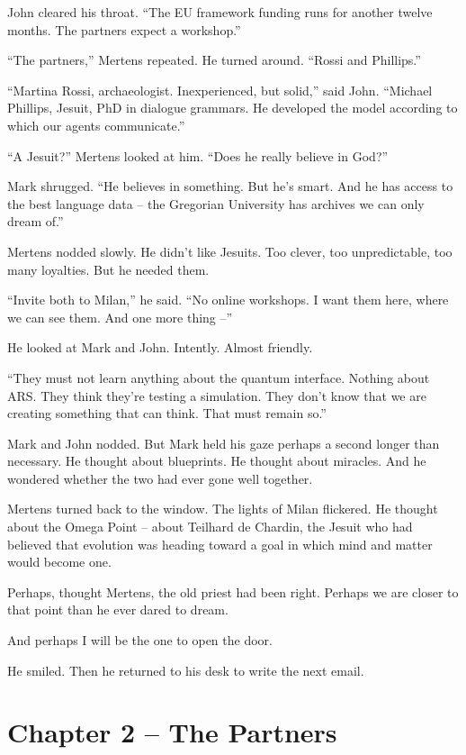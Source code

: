 \documentclass[
]{article}
\begin{document}
John cleared his throat. \enquote{The EU framework funding runs for another twelve months. The partners expect a workshop.}

\enquote{The partners,} Mertens repeated. He turned around. \enquote{Rossi and Phillips.}

\enquote{Martina Rossi, archaeologist. Inexperienced, but solid,} said John. \enquote{Michael Phillips, Jesuit, PhD in dialogue grammars. He developed the model according to which our agents communicate.}

\enquote{A Jesuit?} Mertens looked at him. \enquote{Does he really believe in God?}

Mark shrugged. \enquote{He believes in something. But he's smart. And he has access to the best language data -- the Gregorian University has archives we can only dream of.}

Mertens nodded slowly. He didn't like Jesuits. Too clever, too unpredictable, too many loyalties. But he needed them.

\enquote{Invite both to Milan,} he said. \enquote{No online workshops. I want them here, where we can see them. And one more thing --}

He looked at Mark and John. Intently. Almost friendly.

\enquote{They must not learn anything about the quantum interface. Nothing about ARS. They think they're testing a simulation. They don't know that we are creating something that can think. That must remain so.}

Mark and John nodded. But Mark held his gaze perhaps a second longer than necessary. He thought about blueprints. He thought about miracles. And he wondered whether the two had ever gone well together.

Mertens turned back to the window. The lights of Milan flickered. He thought about the Omega Point -- about Teilhard de Chardin, the Jesuit who had believed that evolution was heading toward a goal in which mind and matter would become one.

Perhaps, thought Mertens, the old priest had been right. Perhaps we are closer to that point than he ever dared to dream.

And perhaps I will be the one to open the door.

He smiled. Then he returned to his desk to write the next email.

\newpage

\section{Chapter 2 -- The Partners}
\end{document}
